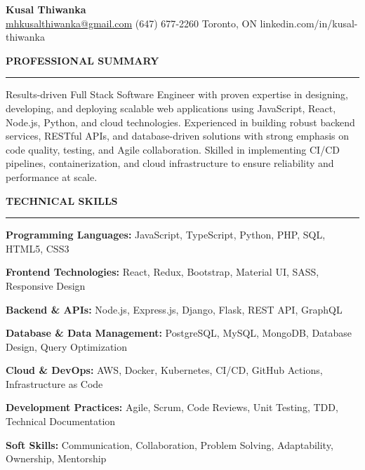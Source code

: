 \documentclass[10pt,letterpaper]{article}
\begin{document}
\begin{center}
{\LARGE\textbf{Kusal Thiwanka}}\\[3pt]
\href{mailto:mhkusalthiwanka@gmail.com}{mhkusalthiwanka@gmail.com}\hspace{2em}%
(647) 677{-}2260\hspace{2em}%
Toronto, ON\hspace{2em}
linkedin.com/in/kusal-thiwanka
\end{center}

\vspace{6pt}

\textbf{PROFESSIONAL SUMMARY}\\[-8pt]
\noindent\rule{\textwidth}{1pt}

\vspace{-2pt}

Results-driven Full Stack Software Engineer with proven expertise in designing, developing, and deploying scalable web applications using JavaScript, React, Node.js, Python, and cloud technologies. Experienced in building robust backend services, RESTful APIs, and database-driven solutions with strong emphasis on code quality, testing, and Agile collaboration. Skilled in implementing CI/CD pipelines, containerization, and cloud infrastructure to ensure reliability and performance at scale.

\vspace{8pt}

\textbf{TECHNICAL SKILLS}\\[-8pt]
\noindent\rule{\textwidth}{1pt}

\vspace{-2pt}

\textbf{Programming Languages:} JavaScript, TypeScript, Python, PHP, SQL, HTML5, CSS3

\textbf{Frontend Technologies:} React, Redux, Bootstrap, Material UI, SASS, Responsive Design

\textbf{Backend \& APIs:} Node.js, Express.js, Django, Flask, REST API, GraphQL

\textbf{Database \& Data Management:} PostgreSQL, MySQL, MongoDB, Database Design, Query Optimization

\textbf{Cloud \& DevOps:} AWS, Docker, Kubernetes, CI/CD, GitHub Actions, Infrastructure as Code

\textbf{Development Practices:} Agile, Scrum, Code Reviews, Unit Testing, TDD, Technical Documentation

\textbf{Soft Skills:} Communication, Collaboration, Problem Solving, Adaptability, Ownership, Mentorship
\end{document}
